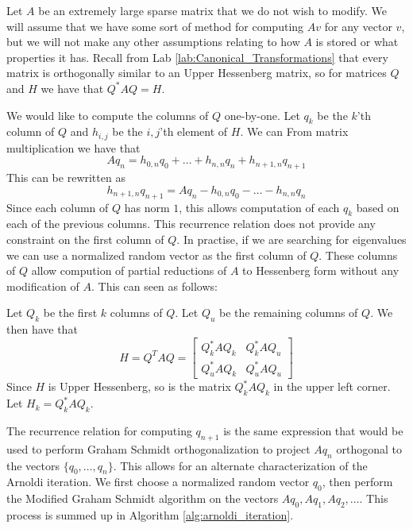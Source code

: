 Let $A$ be an extremely large sparse matrix that we do not wish to modify.
We will assume that we have some sort of method for computing $A v$ for any vector $v$, but we will not make any other assumptions relating to how $A$ is stored or what properties it has.
Recall from Lab \ref{lab:Canonical_Transformations} that every matrix is orthogonally similar to an Upper Hessenberg matrix, so for matrices $Q$ and $H$ we have that $Q^* A Q = H$.

We would like to compute the columns of $Q$ one-by-one.
Let $q_k$ be the $k$'th column of $Q$ and $h_{i,j}$ be the $i,j$'th element of $H$.
We can 
From matrix multiplication we have that 
\[A q_n = h_{0, n} q_0 + \dots + h_{n, n} q_n + h_{n+1, n} q_{n+1}\]
This can be rewritten as
\[h_{n+1, n} q_{n+1} = A q_n - h_{0,n} q_0 - \dots - h_{n,n} q_n\]
Since each column of $Q$ has norm $1$, this allows computation of each $q_k$ based on each of the previous columns.
This recurrence relation does not provide any constraint on the first column of $Q$.
In practise, if we are searching for eigenvalues we can use a normalized random vector as the first column of $Q$.
These columns of $Q$ allow compution of partial reductions of $A$ to Hessenberg form without any modification of $A$.
This can seen as follows:

Let $Q_k$ be the first $k$ columns of $Q$.
Let $Q_u$ be the remaining columns of $Q$.
We then have that
\[H = Q^T A Q =
\begin{bmatrix}
Q_k^* A Q_k & Q_k^* A Q_u \\
Q_u^* A Q_k & Q_u^* A Q_u
\end{bmatrix}\]
Since $H$ is Upper Hessenberg, so is the matrix $Q_k^* A Q_k$ in the upper left corner.
Let $H_k = Q_k^* A Q_k$.

The recurrence relation for computing $q_{n+1}$ is the same expression that would be used to perform Graham Schmidt orthogonalization to project $A q_n$ orthogonal to the vectors $\lbrace q_0, \dots, q_n \rbrace$.
This allows for an alternate characterization of the Arnoldi iteration.
We first choose a normalized random vector $q_0$, then perform the Modified Graham Schmidt algorithm on the vectors $A q_0, A q_1, A q_2, \dots$.
This process is summed up in Algorithm \ref{alg:arnoldi_iteration}.

